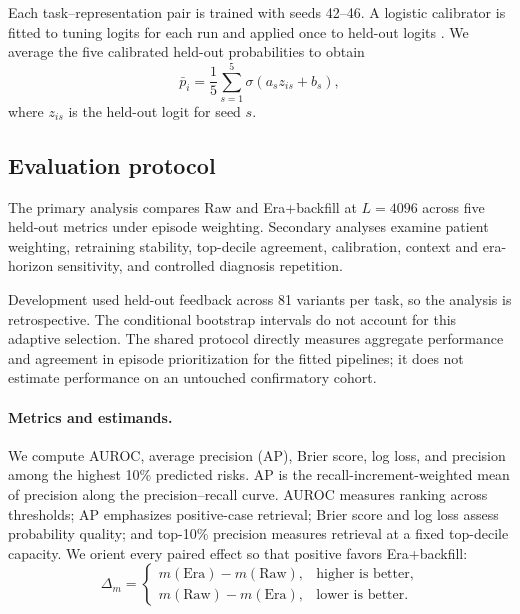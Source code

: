 \documentclass{article}
\newcommand{\topten}{top-10\%}
\begin{document}
Each task--representation pair is trained with seeds 42--46. A logistic
calibrator is fitted to tuning logits for each run and applied once to held-out
logits \citep{platt1999probabilistic,guo2017calibration}. We average the five
calibrated held-out probabilities to obtain
\begin{equation}
\bar p_i=\frac{1}{5}\sum_{s=1}^{5}\sigma(a_s z_{is}+b_s),
\end{equation}
where $z_{is}$ is the held-out logit for seed $s$.

\subsection{Evaluation protocol}

The primary analysis compares Raw and Era+backfill at $L=4096$ across five
held-out metrics under episode weighting. Secondary analyses examine patient
weighting, retraining stability, top-decile agreement, calibration, context and
era-horizon sensitivity, and controlled diagnosis repetition.

Development used held-out feedback across 81 variants per task, so the analysis
is retrospective. The conditional bootstrap intervals do not account for this
adaptive selection. The shared protocol directly measures aggregate performance
and agreement in episode prioritization for the fitted pipelines; it does not
estimate performance on an untouched confirmatory cohort.

\paragraph{Metrics and estimands.}

We compute AUROC, average precision (AP), Brier score, log loss, and precision
among the highest 10\% predicted risks. AP is the recall-increment-weighted mean
of precision along the precision--recall curve. AUROC measures ranking across
thresholds; AP emphasizes positive-case retrieval; Brier score and log loss
assess probability quality; and \topten{} precision measures retrieval at a
fixed top-decile capacity. We orient every paired effect so that positive favors
Era+backfill:
\begin{equation}
\Delta_m=\begin{cases}
m(\mathrm{Era})-m(\mathrm{Raw}), & \text{higher is better},\\
m(\mathrm{Raw})-m(\mathrm{Era}), & \text{lower is better}.
\end{cases}
\end{equation}
\end{document}
